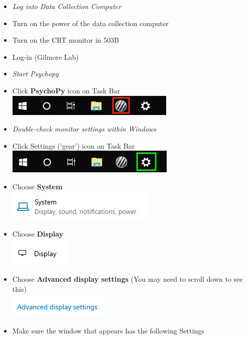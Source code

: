 \documentclass[]{article}
\begin{document}
\begin{itemize}
\item
  \emph{Log into Data Collection Computer}
\item
  Turn on the power of the data collection computer
\item
  Turn on the CRT monitor in 503B
\item
  Log-in (Gilmore Lab)
\item
  \emph{Start Psychopy}
\item
  Click \textbf{PsychoPy} icon on Task Bar
  \includegraphics{images/PsychoPy-1.PNG}\\
\item
  \emph{Double-check monitor settings within Windows}
\item
  Click Settings (`gear') icon on Task Bar
  \includegraphics{images/DispSettings-1.PNG}\\
\item
  Choose \textbf{System}\\
  \includegraphics{images/DS2.PNG}\\
\item
  Choose \textbf{Display}\\
  \includegraphics{images/ds3.PNG}\\
\item
  Choose \textbf{Advanced display settings} (You may need to scroll down
  to see this)\\
  \includegraphics{images/DS4.PNG}\\
\item
  Make sure the window that appears has the following Settings\\

\end{itemize}
\end{document}
